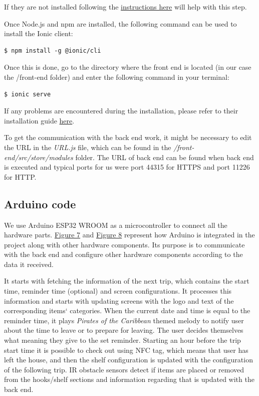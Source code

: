 \documentclass{article}
\begin{document}
If they are not installed following the   \href{https://ionicframework.com/docs/intro/environment}{instructions here} will help with this step.

Once Node.js and npm are installed, the following command can be used to install the Ionic client:
\begin{lstlisting}
$ npm install -g @ionic/cli
\end{lstlisting}
Once this is done, go to the directory where the front end is located (in our case the /front-end folder) and enter the following command in your terminal:
\begin{lstlisting}
$ ionic serve
\end{lstlisting}
If any problems are encountered during the installation, please refer to their installation guide \href{https://ionicframework.com/docs/intro/cli}{here}.\cite{IONIN}

To get the communication with the back end work, it might be necessary to edit the URL in the \textit{URL.js} file, which can be found in the \textit{/front-end/src/store/modules} folder. The URL of back end can be found when back end is executed and typical ports for us were port 44315 for HTTPS and port 11226 for HTTP.

\subsection{Arduino code}
We use Arduino ESP32 WROOM as a microcontroller to connect all the hardware parts. \hyperref[fig:electronics-main]{Figure 7} and \hyperref[fig:electronics-extension]{Figure 8} represent how Arduino is integrated in the project along with other hardware components. Its purpose is to communicate with the back end and configure other hardware components according to the data it received. 

It starts with fetching the information of the next trip, which contains the start time, reminder time (optional) and screen configurations. It processes this information and starts with updating screens with the logo and text of the corresponding items` categories. When the current date and time is equal to the reminder time, it plays \textit{Pirates of the Caribbean} themed melody to notify user about the time to leave or to prepare for leaving. The user decides themselves what meaning they give to the set reminder. Starting an hour before the trip start time it is possible to check out using NFC tag, which means that user has left the house, and then the shelf configuration is updated with the configuration of the following trip. IR obstacle sensors detect if items are placed or removed from the hooks/shelf sections and information regarding that is updated with the back end. 
\end{document}
